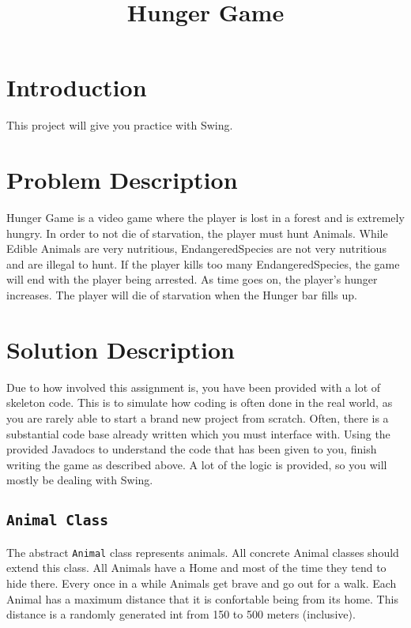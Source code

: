 \documentclass[12pt]{article}
\title{Hunger Game}
\author{}
\date{}
\begin{document}
\maketitle

\section{Introduction}

This project will give you practice with Swing.

\section{Problem Description}

Hunger Game is a video game where the player is lost in a forest and is extremely hungry.  In order to not die of starvation, the player must hunt Animals.  While Edible Animals are very nutritious, EndangeredSpecies are not very nutritious and are illegal to hunt.  If the player kills too many EndangeredSpecies, the game will end with the player being arrested.  As time goes on, the player's hunger increases.  The player will die of starvation when the Hunger bar fills up.

\section{Solution Description}

Due to how involved this assignment is, you have been provided with a lot of skeleton code. This is to simulate how coding is often done in the real world, as you are rarely able to start a brand new project from scratch. Often, there is a substantial code base already written which you must interface with.
Using the provided Javadocs to understand the code that has been given to you, finish writing the game as described above.  A lot of the logic is provided, so you will mostly be dealing with Swing.

\newpage

\subsection{{\tt Animal Class}}

The abstract {\tt Animal} class represents animals.  All concrete Animal classes should extend this class. All Animals have a Home and most of the time they tend to hide there.  Every once in a while Animals get brave and go out for a walk.  Each Animal has a maximum distance that it is confortable being from its home.
This distance is a randomly generated int from 150 to 500 meters (inclusive).
\end{document}

